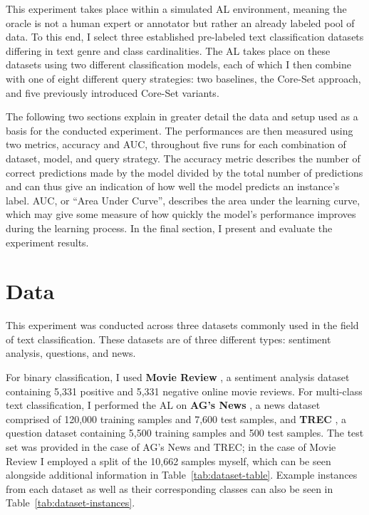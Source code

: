\documentclass[english,bachelor,ul]{webisthesis} %
\begin{document}
This experiment takes place within a simulated AL environment, meaning the oracle is not a human expert or annotator but rather an already labeled pool of data. To this end, I select three established pre-labeled text classification datasets differing in text genre and class cardinalities. The AL takes place on these datasets using two different classification models, each of which I then combine with one of eight different query strategies: two baselines, the Core-Set approach, and five previously introduced Core-Set variants.

The following two sections explain in greater detail the data and setup used as a basis for the conducted experiment. The performances are then measured using two metrics, accuracy and AUC, throughout five runs for each combination of dataset, model, and query strategy. The accuracy metric describes the number of correct predictions made by the model divided by the total number of predictions and can thus give an indication of how well the model predicts an instance's label. AUC, or ``Area Under Curve'', describes the area under the learning curve, which may give some measure of how quickly the model's performance improves during the learning process. In the final section, I present and evaluate the experiment results.

\section{Data}

This experiment was conducted across three datasets commonly used in the field of text classification. These datasets are of three different types: sentiment analysis, questions, and news. 

For binary classification, I used \textbf{Movie Review} \citep{DBLP:conf/acl/PangL05}, a sentiment analysis dataset containing 5,331 positive and 5,331 negative online movie reviews. For multi-class text classification, I performed the AL on \textbf{AG's News} \citep{DBLP:conf/nips/ZhangZL15}, a news dataset comprised of 120,000 training samples and 7,600 test samples, and \textbf{TREC} \citep{DBLP:journals/nle/LiR06}, a question dataset containing 5,500 training samples and 500 test samples. The test set was provided in the case of AG's News and TREC; in the case of Movie Review I employed a split of the 10,662 samples myself, which can be seen alongside additional information in Table~\ref{tab:dataset-table}. Example instances from each dataset as well as their corresponding classes can also be seen in Table~\ref{tab:dataset-instances}.
\end{document}
